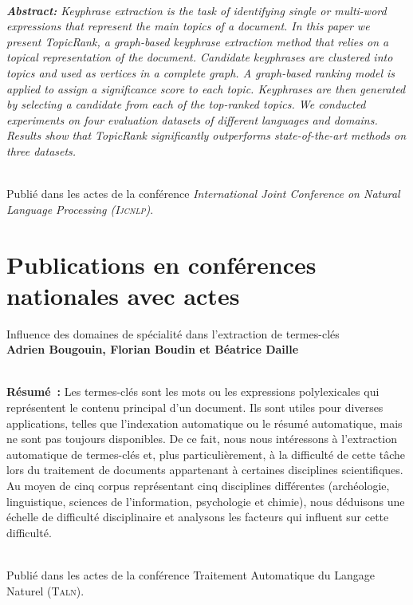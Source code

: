   ~\\\textit{
    \textbf{Abstract:}
    Keyphrase extraction is the task of identifying single or multi-word
    expressions that represent the main topics of a document. In this paper we
    present TopicRank, a graph-based keyphrase extraction method that relies on
    a topical representation of the document. Candidate keyphrases are clustered
    into topics and used as vertices in a complete graph. A graph-based ranking
    model is applied to assign a significance score to each topic. Keyphrases
    are then generated by selecting a candidate from each of the top-ranked
    topics. We conducted experiments on four evaluation datasets of different
    languages and domains. Results show that TopicRank significantly outperforms
    state-of-the-art methods on three datasets.
  }

  ~\\Publié dans les actes de la conférence \textit{International Joint
  Conference on Natural Language Processing (\textsc{Ijcnlp})}.

  \section*{Publications en conférences nationales avec actes}

  Influence des domaines de spécialité dans l'extraction de
  termes-clés\\\textbf{Adrien Bougouin, Florian Boudin et Béatrice
  Daille}\\\cite{bougouin2014difficulty}

  ~\\\textbf{Résumé~:}
  Les termes-clés sont les mots ou les expressions polylexicales qui
  représentent le contenu principal d'un document. Ils sont utiles pour
  diverses applications, telles que l'indexation automatique ou le résumé
  automatique, mais ne sont pas toujours disponibles. De ce fait, nous nous
  intéressons à l'extraction automatique de termes-clés et, plus
  particulièrement, à la difficulté de cette tâche lors du traitement de
  documents appartenant à certaines disciplines scientifiques. Au moyen de
  cinq corpus représentant cinq disciplines différentes (archéologie,
  linguistique, sciences de l'information, psychologie et chimie), nous
  déduisons une échelle de difficulté disciplinaire et analysons les facteurs
  qui influent sur cette difficulté.

  ~\\Publié dans les actes de la conférence Traitement Automatique du Langage
  Naturel (\textsc{Taln}).

